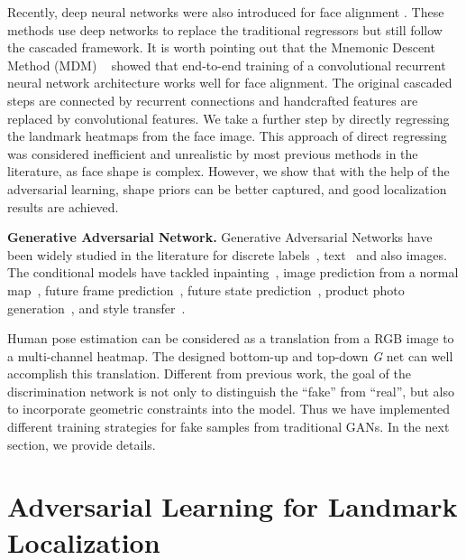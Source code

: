 \documentclass[10pt,journal,compsoc]{IEEEtran}
\begin{document}
Recently, deep neural networks were also introduced for face alignment \cite{sun2013deep,zhang2014coarse,chen2015facial,chen2016face}.
These methods use deep networks to replace the traditional regressors but still follow the cascaded framework.
It is worth pointing out that the Mnemonic Descent Method (MDM) ~\cite{trigeorgis2016mnemonic} showed that end-to-end  training of a convolutional recurrent neural network architecture works well for face alignment.
The original cascaded steps are connected by recurrent connections and  handcrafted features are replaced by  convolutional features.
We take a further step by directly regressing the landmark heatmaps from the face image.
This approach of direct regressing was considered inefficient and unrealistic by most
previous methods in the literature, as face shape is complex.
However, we show that with the help of the adversarial learning, shape priors can be better captured, and good localization results are
achieved.





{\bf Generative Adversarial Network.}
Generative Adversarial Networks have been widely studied in the literature for discrete labels~\cite{journals/corr/MirzaO14}, text~\cite{reed2016generative} and also images.
The conditional models have tackled inpainting~\cite{conf/cvpr/PathakKDDE16}, image prediction from a normal map~\cite{conf/eccv/WangG16}, future frame prediction~\cite{journals/corr/MathieuCL15}, future state prediction~\cite{conf/eccv/ZhouB16}, product photo generation~\cite{conf/eccv/YooKPPK16}, and style transfer~\cite{conf/eccv/LifshitzFU16}.

Human pose estimation can be considered as a translation from a RGB image to a multi-channel heatmap.
The designed bottom-up and top-down \textit{G} net can well accomplish this translation.
Different from previous work, the goal of the discrimination network is not only to distinguish the ``fake'' from ``real'', but also to incorporate geometric constraints into the model.
Thus we have implemented different training strategies for fake samples from traditional GANs.
In the next section, we provide details.







\section{Adversarial Learning for Landmark Localization}\label{sec:GcNet-for-Human}
%
\end{document}
